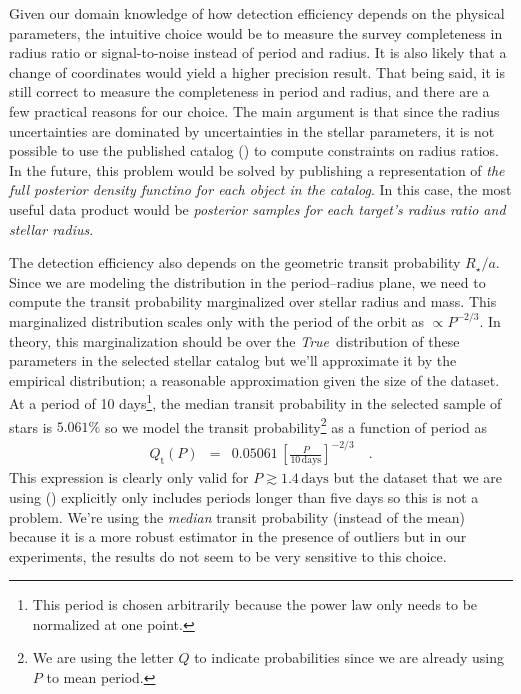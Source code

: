 \documentclass[12pt,preprint]{aastex}
\newcommand{\foreign}[1]{\emph{#1}}
\newcommand{\True}{\foreign{True}}
\newcommand{\period}{\ensuremath{P}}
\newcommand{\transitprob}{{\ensuremath{Q_\mathrm{t}}}}
\begin{document}
Given our domain knowledge of how detection efficiency depends on the physical
parameters, the intuitive choice would be to measure the survey completeness
in radius ratio or signal-to-noise instead of period and radius.
It is also likely that a change of coordinates would yield a higher precision
result.
That being said, it is still correct to measure the completeness in period and
radius, and there are a few practical reasons for our choice.
The main argument is that since the radius uncertainties are dominated by
uncertainties in the stellar parameters, it is not possible to use the
published catalog (\citealt{petigura}) to compute constraints on radius
ratios.
In the future, this problem would be solved by publishing a representation of
\emph{the full posterior density functino for each object in the catalog}.
In this case, the most useful data product would be \emph{posterior samples
for each target's radius ratio and stellar radius}.

The detection efficiency also depends on the geometric transit probability
$R_\star/a$.
Since we are modeling the distribution in the period--radius plane, we need to
compute the transit probability marginalized over stellar radius and mass.
This marginalized distribution scales only with the period of the orbit as
$\propto \period^{-2/3}$.
In theory, this marginalization should be over the \True\ distribution of
these parameters in the selected stellar catalog but we'll approximate it by
the empirical distribution; a reasonable approximation given the size of the
dataset.
At a period of 10 days\footnote{This period is chosen arbitrarily because the
power law only needs to be normalized at one point.}, the median transit
probability in the selected sample of stars is $5.061\%$ so we model the
transit probability\footnote{We are using the letter $Q$ to indicate
probabilities since we are already using $P$ to mean period.} as a function of
period as
\begin{eqnarray}
\transitprob (\period) &=&
    0.05061\,\left[\frac{\period}{10\,\mathrm{days}}\right]^{-2/3} \quad.
\end{eqnarray}
This expression is clearly only valid for $\period \gtrsim 1.4\,\mathrm{days}$
but the dataset that we are using (\citealt{petigura}) explicitly only
includes periods longer than five days so this is not a problem.
We're using the \emph{median} transit probability (instead of the mean)
because it is a more robust estimator in the presence of outliers but in our
experiments, the results do not seem to be very sensitive to this choice.
\end{document}
